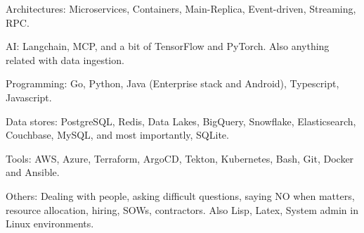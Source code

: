 \begin{rlist}
  \item Architectures: Microservices, Containers, Main-Replica, Event-driven, Streaming, RPC.
  \item AI: Langchain, MCP, and a bit of TensorFlow and PyTorch. Also anything related with data ingestion.
  \item Programming: Go, Python, Java (Enterprise stack and Android), Typescript, Javascript.
  \item Data stores: PostgreSQL, Redis, Data Lakes, BigQuery, Snowflake, Elasticsearch, Couchbase, MySQL, and most importantly, SQLite.
  \item Tools: AWS, Azure, Terraform, ArgoCD, Tekton, Kubernetes, Bash, Git, Docker and Ansible.
  \item Others: Dealing with people, asking difficult questions, saying NO when matters, resource allocation, hiring, SOWs, contractors.
  Also Lisp, Latex, System admin in Linux environments.
\end{rlist}

